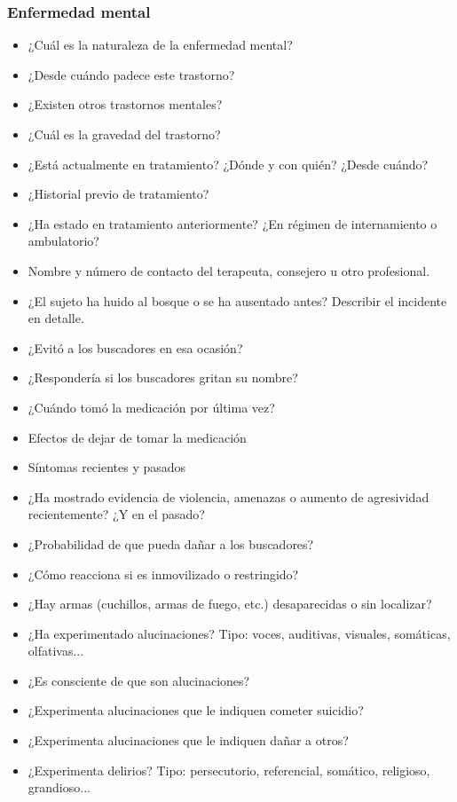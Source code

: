 \subsubsection{Enfermedad mental}
\begin{itemize}
    \item ¿Cuál es la naturaleza de la enfermedad mental?
    \item ¿Desde cuándo padece este trastorno?
    \item ¿Existen otros trastornos mentales?
    \item ¿Cuál es la gravedad del trastorno?
    \item ¿Está actualmente en tratamiento? ¿Dónde y con quién? ¿Desde cuándo?
    \item ¿Historial previo de tratamiento?
    \item ¿Ha estado en tratamiento anteriormente? ¿En régimen de internamiento o ambulatorio?
    \item Nombre y número de contacto del terapeuta, consejero u otro profesional.
    \item ¿El sujeto ha huido al bosque o se ha ausentado antes? Describir el incidente en detalle.
    \item ¿Evitó a los buscadores en esa ocasión?
    \item ¿Respondería si los buscadores gritan su nombre?
    \item ¿Cuándo tomó la medicación por última vez?
    \item Efectos de dejar de tomar la medicación
    \item Síntomas recientes y pasados
    \item ¿Ha mostrado evidencia de violencia, amenazas o aumento de agresividad recientemente? ¿Y en el pasado?
    \item ¿Probabilidad de que pueda dañar a los buscadores?
    \item ¿Cómo reacciona si es inmovilizado o restringido?
    \item ¿Hay armas (cuchillos, armas de fuego, etc.) desaparecidas o sin localizar?
    \item ¿Ha experimentado alucinaciones? Tipo: voces, auditivas, visuales, somáticas, olfativas...
    \item ¿Es consciente de que son alucinaciones?
    \item ¿Experimenta alucinaciones que le indiquen cometer suicidio?
    \item ¿Experimenta alucinaciones que le indiquen dañar a otros?
    \item ¿Experimenta delirios? Tipo: persecutorio, referencial, somático, religioso, grandioso...

\end{itemize}
